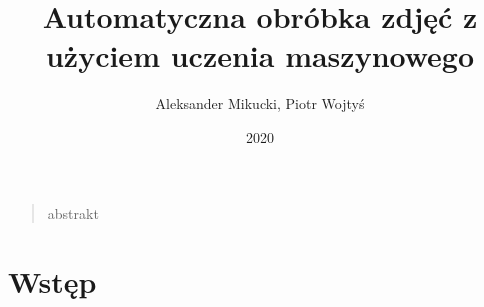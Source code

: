 \documentclass[12pt]{article}
\title{Automatyczna obróbka zdjęć z użyciem uczenia maszynowego}
\author
{Aleksander Mikucki, Piotr Wojtyś}
\date{2020}
\newenvironment{sciabstract}{%
\begin{quote} \bf}
{\end{quote}}
\begin{document}
 


\baselineskip24pt


\maketitle 




\begin{sciabstract}

abstrakt

\end{sciabstract}


\section*{Wstęp}






\end{document}
